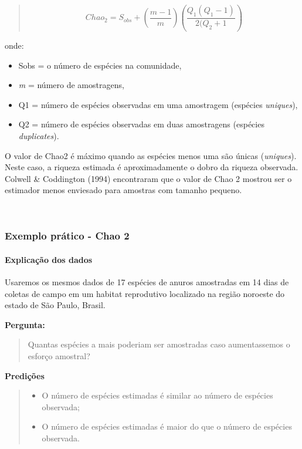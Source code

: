 \documentclass[
]{book}
\providecommand{\tightlist}{%
  \setlength{\itemsep}{0pt}\setlength{\parskip}{0pt}}
\begin{document}
\begin{quote}
\[Chao_{2} = S_{obs} + \left(\frac{m-1}{m}\right)\left(\frac{Q_1(Q_1-1)}{2(Q_2 + 1}\right)\]
\end{quote}

onde:

\begin{itemize}
\item
  Sobs = o número de espécies na comunidade,
\item
  \emph{m} = número de amostragens,
\item
  Q1 = número de espécies observadas em uma amostragem (espécies \emph{uniques}),
\item
  Q2 = número de espécies observadas em duas amostragens (espécies \emph{duplicates}).
\end{itemize}

O valor de Chao2 é máximo quando as espécies menos uma são únicas (\emph{uniques}). Neste caso, a riqueza estimada é aproximadamente o dobro da riqueza observada. Colwell \& Coddington (1994) encontraram que o valor de Chao 2 mostrou ser o estimador menos enviesado para amostras com tamanho pequeno.

~

\hypertarget{exemplo-pruxe1tico---chao-2}{%
\subsubsection{Exemplo prático - Chao 2}\label{exemplo-pruxe1tico---chao-2}}

\hypertarget{explicauxe7uxe3o-dos-dados-2}{%
\paragraph{Explicação dos dados}\label{explicauxe7uxe3o-dos-dados-2}}

Usaremos os mesmos dados de 17 espécies de anuros amostradas em 14 dias de coletas de campo em um habitat reprodutivo localizado na região noroeste do estado de São Paulo, Brasil.

\textbf{Pergunta:}

\begin{quote}
Quantas espécies a mais poderiam ser amostradas caso aumentassemos o esforço amostral?
\end{quote}

\textbf{Predições}

\begin{quote}
\begin{itemize}
\tightlist
\item
  O número de espécies estimadas é similar ao número de espécies observada;
\item
  O número de espécies estimadas é maior do que o número de espécies observada.
\end{itemize}
\end{quote}
\end{document}
